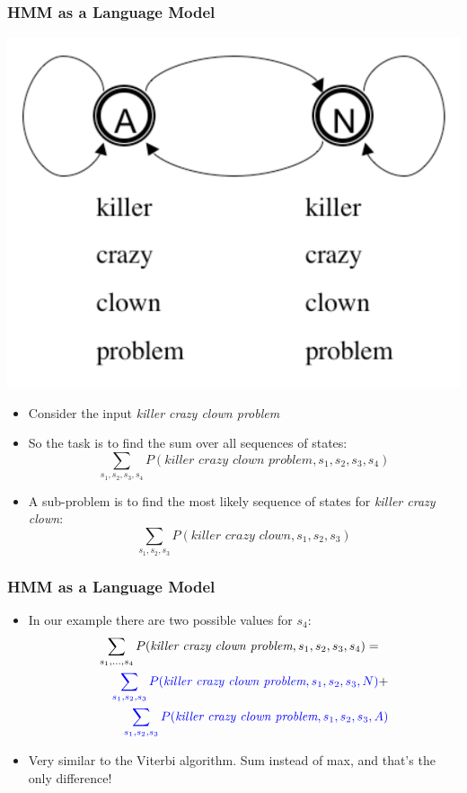 \begin{frame}
\frametitle{HMM as a Language Model}
\begin{center}
\includegraphics[scale=.3]{figures/hmmfig}
\end{center}
\begin{itemize}[<+->]
\item Consider the input {\it killer crazy clown problem}
\item So the task is to find the sum over all sequences of states:
\[ \sum_{s_1, s_2, s_3, s_4} P(\textit{killer crazy clown problem}, s_1, s_2, s_3, s_4) \]
\item A sub-problem is to find the most likely sequence of states for {\it killer crazy clown}:
\[ \sum_{s_1, s_2, s_3} P(\textit{killer crazy clown}, s_1, s_2, s_3) \]
\end{itemize}
\end{frame}

\begin{frame}
\frametitle{HMM as a Language Model}
\begin{itemize}[<+->]
\item In our example there are two possible values for $s_4$:
\begin{eqnarray*}
\lefteqn{\sum_{s_1, \ldots, s_4} P(\textit{killer crazy clown problem}, s_1, s_2, s_3, s_4) =} \\
&& {\color{blue} \sum_{s_1, s_2, s_3} P(\textit{killer crazy clown problem}, s_1, s_2, s_3, N) } + \\
&&  {\color{blue} \sum_{s_1, s_2, s_3} P(\textit{killer crazy clown problem}, s_1, s_2, s_3, A) }
\end{eqnarray*}
\item Very similar to the Viterbi algorithm. Sum instead of max, and that's the only difference!
\end{itemize}
\end{frame}


